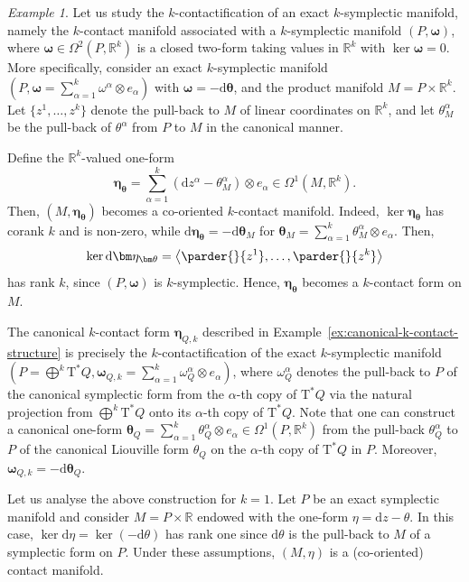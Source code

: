 \documentclass[11pt,twoside]{article}
\theoremstyle{plain}
\theoremstyle{definition}
\theoremstyle{remark}
\newtheorem{example}[theorem]{Example} %
\newcommand{\dd}{\mathrm{d}}
\newcommand{\T}{\mathrm{T}}
\newcommand{\cT}{\mathrm{T}^\ast}
\begin{document}
\begin{example}\label{ex:contactification-k-symplectic-manifold}
Let us study the $k$-contactification of an exact $k$-symplectic manifold, namely the $k$-contact manifold associated with a $k$-symplectic manifold $(P,\bm \omega)$, where $\bm \omega\in \Omega^2(P,\mathbb{R}^k)$ is a closed two-form taking values in $\mathbb{R}^k$ with $\ker \bm\omega=0$. More specifically, consider an exact $k$-symplectic manifold $(P,\bm\omega = \sum_{\alpha=1}^k \omega^\alpha \otimes e_\alpha)$ with $\bm \omega  = -\dd\bm \theta$, and the product manifold $M = P \times \mathbb{R}^k$. Let $\{z^1,\dotsc,z^k\}$ denote the pull-back to $M$ of linear coordinates on $\mathbb{R}^k$, and let $\theta_M^\alpha$ be the pull-back of $\theta^\alpha$ from $P$ to $M$ in the canonical manner.

Define the $\mathbb{R}^k$-valued one-form
\[
\bm\eta_{\bm \theta} = \sum_{\alpha=1}^k ( \dd z^\alpha - \theta_M^\alpha)\otimes e_\alpha \in \Omega^1(M,\mathbb{R}^k).
\]
Then, $(M,\bm\eta_{\bm \theta})$ becomes a co-oriented $k$-contact manifold. Indeed, $\ker \bm\eta_{\bm \theta}$ has corank $k$ and is non-zero, while $\dd \bm\eta_{\bm \theta} = -\dd \bm\theta_M$ for $\bm \theta_M=\sum_{\alpha=1}^k\theta^\alpha_M\otimes e_\alpha$. Then,
\[
\ker \dd \bm\eta_{\bm \theta} = \left\langle \parder{}{z^1},\dotsc,\parder{}{z^k} \right\rangle
\]
has rank $k$, since $(P,\bm\omega)$ is $k$-symplectic. Hence, $\bm\eta_{\bm \theta}$ becomes a $k$-contact form on $M$.

The canonical $k$-contact form $\bm\eta_{Q,k}$ described in Example~\ref{ex:canonical-k-contact-structure} is precisely the $k$-contactification of the exact $k$-symplectic manifold $(P = \bigoplus^k \cT Q, \bm\omega_{Q,k}=\sum_{\alpha=1}^k \omega_{Q}^\alpha \otimes e_\alpha)$, where $\omega_{Q}^\alpha$ denotes the pull-back to $P$ of the canonical symplectic form from the $\alpha$-th copy of $\cT Q$ via the natural projection from $\bigoplus^k\cT Q$ onto its $\alpha$-th copy of $\cT Q$.  Note that one can construct a canonical one-form $\bm \theta_Q=\sum_{\alpha=1}^k\theta_Q^\alpha\otimes e_\alpha\in \Omega^1(P,\mathbb{R}^k)$ from the pull-back $\theta^\alpha_Q$ to $P$ of the canonical Liouville form $\theta_Q$ on the $\alpha$-th copy of $\T^*Q$ in $P$. Moreover, $\bm\omega_{Q,k}=-\dd\bm\theta_Q$.

Let us analyse the above construction for $k=1$. Let $P$ be an exact symplectic manifold and consider $M = P \times \mathbb{R}$ endowed with the one-form $\eta = \dd z - \theta$. In this case, $\ker \dd \eta = \ker (-\dd \theta)$ has rank one since $\dd \theta$ is the pull-back to $M$ of a symplectic form on $P$. Under these assumptions, $(M,\eta)$ is a (co-oriented) contact manifold.
\end{example}
\end{document}
